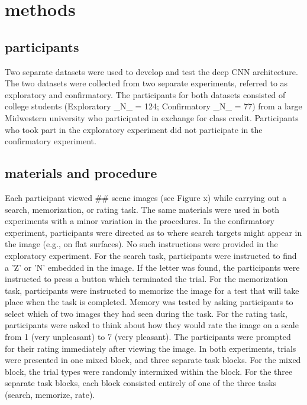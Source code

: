 \section{methods}

\subsection{participants}
Two separate datasets were used to develop and test the deep CNN architecture. The two datasets were collected from two separate experiments, referred to as exploratory and confirmatory. The participants for both datasets consisted of college students (Exploratory _N_ = 124; Confirmatory _N_ = 77) from a large Midwestern university who participated in exchange for class credit. Participants who took part in the exploratory experiment did not participate in the confirmatory experiment. 

\subsection{materials and procedure}
Each participant viewed ## scene images (see Figure x) while carrying out a search, memorization, or rating task. The same materials were used in both experiments with a minor variation in the procedures. In the confirmatory experiment, participants were directed as to where search targets might appear in the image (e.g., on flat surfaces). No such instructions were provided in the exploratory experiment. For the search task, participants were instructed to find a 'Z' or 'N' embedded in the image. If the letter was found, the participants were instructed to press a button which terminated the trial. For the memorization task, participants were instructed to memorize the image for a test that will take place when the task is completed. Memory was tested by asking participants to select which of two images they had seen during the task. For the rating task, participants were asked to think about how they would rate the image on a scale from 1 (very unpleasant) to 7 (very pleasant). The participants were prompted for their rating immediately after viewing the image. In both experiments, trials were presented in one mixed block, and three separate task blocks. For the mixed block, the trial types were randomly intermixed within the block. For the three separate task blocks, each block consisted entirely of one of the three tasks (search, memorize, rate).


